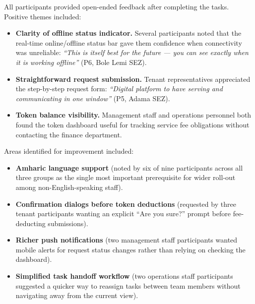 All participants provided open-ended feedback after completing the tasks. Positive themes included:

\begin{itemize}

\item \textbf{Clarity of offline status indicator.} Several participants noted that the real-time online/offline status bar gave them confidence when connectivity was unreliable: \textit{``This is itself best for the future --- you can see exactly when it is working offline''} (P6, Bole Lemi SEZ).

\item \textbf{Straightforward request submission.} Tenant representatives appreciated the step-by-step request form: \textit{``Digital platform to have serving and communicating in one window''} (P5, Adama SEZ).

\item \textbf{Token balance visibility.} Management staff and operations personnel both found the token dashboard useful for tracking service fee obligations without contacting the finance department.

\end{itemize}

Areas identified for improvement included:

\begin{itemize}

\item \textbf{Amharic language support} (noted by six of nine participants across all three groups as the single most important prerequisite for wider roll-out among non-English-speaking staff).

\item \textbf{Confirmation dialogs before token deductions} (requested by three tenant participants wanting an explicit ``Are you sure?'' prompt before fee-deducting submissions).

\item \textbf{Richer push notifications} (two management staff participants wanted mobile alerts for request status changes rather than relying on checking the dashboard).

\item \textbf{Simplified task handoff workflow} (two operations staff participants suggested a quicker way to reassign tasks between team members without navigating away from the current view).

\end{itemize}


